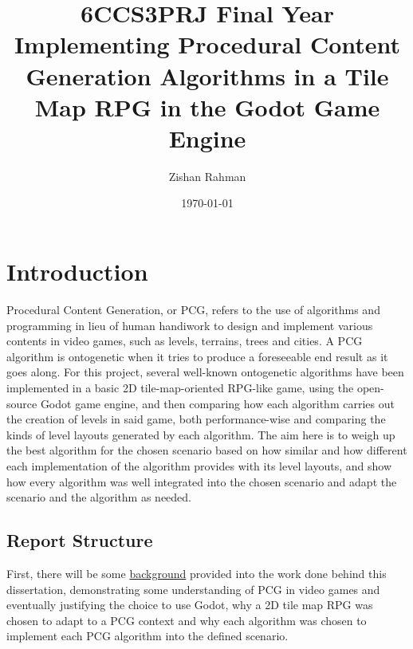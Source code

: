 \documentclass[11pt]{informatics-report}
\title{6CCS3PRJ Final Year\\\vspace{0.2cm}Implementing Procedural Content Generation Algorithms in a Tile Map RPG in the Godot Game Engine}
\author{Zishan Rahman}
\date{\today}
\begin{document}
\createFrontMatter
\onehalfspacing
\tableofcontents{}
\doublespacing


\chapter{Introduction}

Procedural Content Generation, or PCG, refers to the use of algorithms and programming in lieu of human handiwork to design and implement various contents in video games, such as levels, terrains, trees and cities. A PCG algorithm is ontogenetic when it tries to produce a foreseeable end result as it goes along. For this project, several well-known ontogenetic algorithms have been implemented in a basic 2D tile-map-oriented RPG-like game, using the open-source Godot game engine, and then comparing how each algorithm carries out the creation of levels in said game, both performance-wise and comparing the kinds of level layouts generated by each algorithm. The aim here is to weigh up the best algorithm for the chosen scenario based on how similar and how different each implementation of the algorithm provides with its level layouts, and show how every algorithm was well integrated into the chosen scenario and adapt the scenario and the algorithm as needed.

\section{Report Structure}

First, there will be some \hyperref[Background]{background} provided into the work done behind this dissertation, demonstrating some understanding of PCG in video games and eventually justifying the choice to use Godot, why a 2D tile map RPG was chosen to adapt to a PCG context and why each algorithm was chosen to implement each PCG algorithm into the defined scenario.
\end{document}
